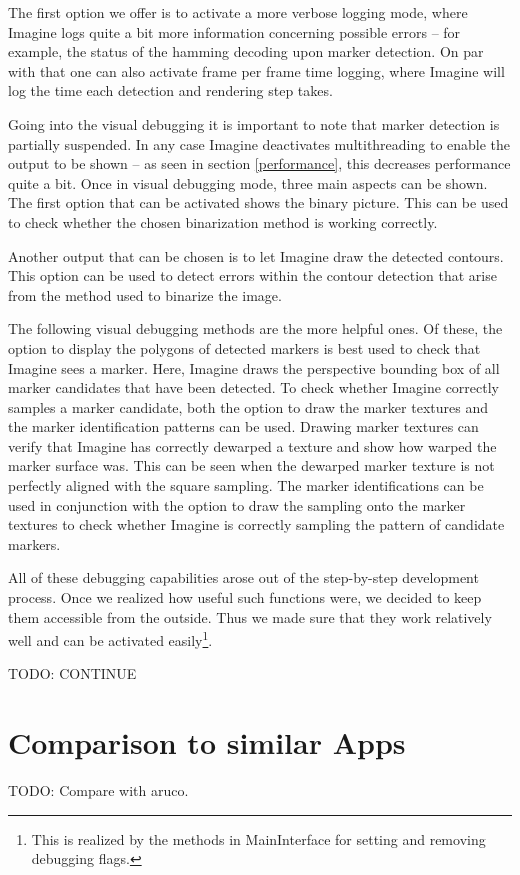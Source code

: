 The first option we offer is to activate a more verbose logging mode, where Imagine logs quite a bit more information concerning possible errors – for example, the status of the hamming decoding upon marker detection.
On par with that one can also activate frame per frame time logging, where Imagine will log the time each detection and rendering step takes.

Going into the visual debugging it is important to note that marker detection is partially suspended.
In any case Imagine deactivates multithreading to enable the output to be shown – as seen in section \ref{performance}, this decreases performance quite a bit.
Once in visual debugging mode, three main aspects can be shown.
The first option that can be activated shows the binary picture.
This can be used to check whether the chosen binarization method is working correctly.

Another output that can be chosen is to let Imagine draw the detected contours.
This option can be used to detect errors within the contour detection that arise from the method used to binarize the image.

The following visual debugging methods are the more helpful ones.
Of these, the option to display the polygons of detected markers is best used to check that Imagine sees a marker.
Here, Imagine draws the perspective bounding box of all marker candidates that have been detected.
To check whether Imagine correctly samples a marker candidate, both the option to draw the marker textures and the marker identification patterns can be used.
Drawing marker textures can verify that Imagine has correctly dewarped a texture and show how warped the marker surface was.
This can be seen when the dewarped marker texture is not perfectly aligned with the square sampling.
The marker identifications can be used in conjunction with the option to draw the sampling onto the marker textures to check whether Imagine is correctly sampling the pattern of candidate markers.

All of these debugging capabilities arose out of the step-by-step development process.
Once we realized how useful such functions were, we decided to keep them accessible from the outside.
Thus we made sure that they work relatively well and can be activated easily\footnote{This is realized by the methods in MainInterface for setting and removing debugging flags.}.

TODO: CONTINUE

\section{Comparison to similar Apps}

TODO: Compare with aruco.
